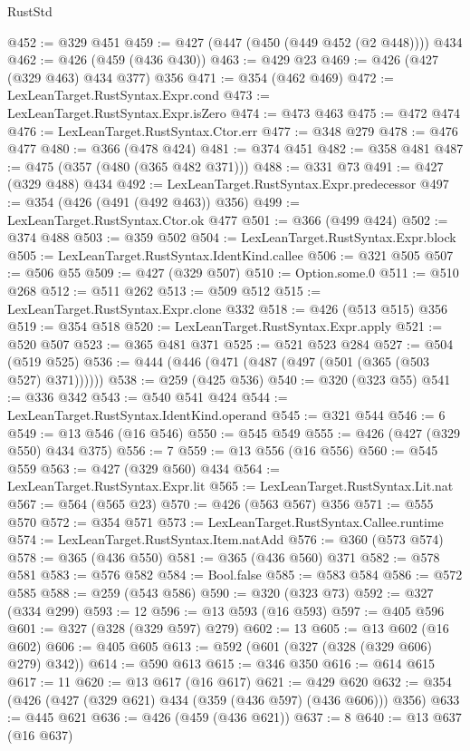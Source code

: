 \begin{lexlean}{RustStd}
\begin{coremodule}
{\begin{coremodule}
{{{{{{{{{@452 := @329 @451
@459 := @427 (@447 (@450 (@449 @452 (@2 @448)))) @434
@462 := @426 (@459 (@436 @430))
@463 := @429 @23
@469 := @426 (@427 (@329 @463) @434 @377) @356
@471 := @354 (@462 @469)
@472 := LexLeanTarget.RustSyntax.Expr.cond
@473 := LexLeanTarget.RustSyntax.Expr.isZero
@474 := @473 @463
@475 := @472 @474
@476 := LexLeanTarget.RustSyntax.Ctor.err
@477 := @348 @279
@478 := @476 @477
@480 := @366 (@478 @424)
@481 := @374 @451
@482 := @358 @481
@487 := @475 (@357 (@480 (@365 @482 @371)))
@488 := @331 @73
@491 := @427 (@329 @488) @434
@492 := LexLeanTarget.RustSyntax.Expr.predecessor
@497 := @354 (@426 (@491 (@492 @463)) @356)
@499 := LexLeanTarget.RustSyntax.Ctor.ok @477
@501 := @366 (@499 @424)
@502 := @374 @488
@503 := @359 @502
@504 := LexLeanTarget.RustSyntax.Expr.block
@505 := LexLeanTarget.RustSyntax.IdentKind.callee
@506 := @321 @505
@507 := @506 @55
@509 := @427 (@329 @507)
@510 := Option.some.{0}
@511 := @510 @268
@512 := @511 @262
@513 := @509 @512
@515 := LexLeanTarget.RustSyntax.Expr.clone @332
@518 := @426 (@513 @515) @356
@519 := @354 @518
@520 := LexLeanTarget.RustSyntax.Expr.apply
@521 := @520 @507
@523 := @365 @481 @371
@525 := @521 @523 @284
@527 := @504 (@519 @525)
@536 := @444 (@446 (@471 (@487 (@497 (@501 (@365 (@503 @527) @371))))))
@538 := @259 (@425 @536)
@540 := @320 (@323 @55)
@541 := @336 @342
@543 := @540 @541 @424
@544 := LexLeanTarget.RustSyntax.IdentKind.operand
@545 := @321 @544
@546 := 6
@549 := @13 @546 (@16 @546)
@550 := @545 @549
@555 := @426 (@427 (@329 @550) @434 @375)
@556 := 7
@559 := @13 @556 (@16 @556)
@560 := @545 @559
@563 := @427 (@329 @560) @434
@564 := LexLeanTarget.RustSyntax.Expr.lit
@565 := LexLeanTarget.RustSyntax.Lit.nat
@567 := @564 (@565 @23)
@570 := @426 (@563 @567) @356
@571 := @555 @570
@572 := @354 @571
@573 := LexLeanTarget.RustSyntax.Callee.runtime
@574 := LexLeanTarget.RustSyntax.Item.natAdd
@576 := @360 (@573 @574)
@578 := @365 (@436 @550)
@581 := @365 (@436 @560) @371
@582 := @578 @581
@583 := @576 @582
@584 := Bool.false
@585 := @583 @584
@586 := @572 @585
@588 := @259 (@543 @586)
@590 := @320 (@323 @73)
@592 := @327 (@334 @299)
@593 := 12
@596 := @13 @593 (@16 @593)
@597 := @405 @596
@601 := @327 (@328 (@329 @597) @279)
@602 := 13
@605 := @13 @602 (@16 @602)
@606 := @405 @605
@613 := @592 (@601 (@327 (@328 (@329 @606) @279) @342))
@614 := @590 @613
@615 := @346 @350
@616 := @614 @615
@617 := 11
@620 := @13 @617 (@16 @617)
@621 := @429 @620
@632 := @354 (@426 (@427 (@329 @621) @434 (@359 (@436 @597) (@436 @606))) @356)
@633 := @445 @621
@636 := @426 (@459 (@436 @621))
@637 := 8
@640 := @13 @637 (@16 @637)
}}}}}}}}}
\end{coremodule}}
\end{coremodule}
\end{lexlean}
